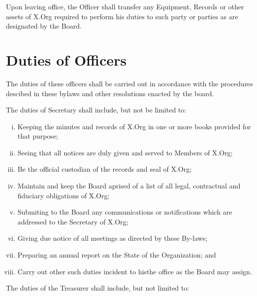 \documentclass[10pt, english]{bylaws}
\begin{document}
Upon leaving office, the Officer shall transfer any Equipment, Records or other
assets of X.Org required to perform his duties to such party or parties as are
designated by the Board.

\section{Duties of Officers}
The duties of these officers shall be carried out in accordance with the
procedures descibed in these bylaws and other resolutions enacted by the board.

The duties of Secretary shall include, but not be limited to:

\begin{enumerate}[(i)\hspace{.2cm}]
	\item Keeping the minutes and records of X.Org in one or more books
	provided for that purpose;

	\item Seeing that all notices are duly given and served to Members of
	X.Org;

	\item Be the official custodian of the records and seal of X.Org;

	\item Maintain and keep the Board aprised of a list of all legal,
	contractual and fiduciary obligations of X.Org;

	\item Submiting to the Board any communications or notifications which
	are addressed to the Secretary of X.Org;

	\item Giving due notice of all meetings as directed by these By-laws;

	\item Preparing an annual report on the State of the Organization; and

	\item Carry out other such duties incident to histhe office as the Board
	may assign.
\end{enumerate}

The duties of the Treasurer shall include, but not limited to:
\end{document}
